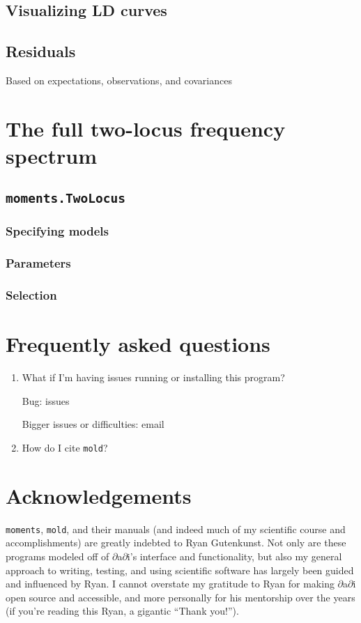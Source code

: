 \documentclass[11pt]{article}
\makeatletter
\newcommand{\dadi}{$\partial$a$\partial$i\xspace}
\newcommand{\mold}{\texttt{mold}\xspace}
\newcommand{\py}[1]{\lstinline[breaklines=true,language=Python, showstringspaces=False]@#1@}
\makeatother
\begin{document}
\subsection{Visualizing LD curves}


\subsection{Residuals}
Based on expectations, observations, and covariances


\section{The full two-locus frequency spectrum}

\subsection{\texttt{moments.TwoLocus}}

\subsubsection{Specifying models}

\subsubsection{Parameters}

\subsubsection{Selection}


\section{Frequently asked questions}

\begin{enumerate}

\item What if I'm having issues running or installing this program?

Bug: issues

Bigger issues or difficulties: email

\item How do I cite \mold?

\end{enumerate}



\section{Acknowledgements}
\py{moments}, \mold, and their manuals (and indeed much of my scientific course and accomplishments) are greatly indebted to Ryan Gutenkunst.
Not only are these programs modeled off of \dadi's interface and functionality, but also my general approach to writing, testing, and using scientific software has largely been guided and influenced by Ryan.
I cannot overstate my gratitude to Ryan for making \dadi open source and accessible, and more personally for his mentorship over the years (if you're reading this Ryan, a gigantic ``Thank you!'').





\end{document}
